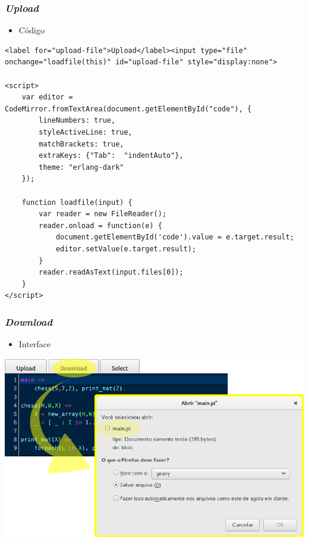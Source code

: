\documentclass[brazil]{beamer}
\begin{document}
\begin{frame}[fragile]

    \frametitle{\textit{Upload}}

    \begin{itemize}
      \item Código
    \end{itemize}

\begin{lstlisting}
<label for="upload-file">Upload</label><input type="file" onchange="loadfile(this)" id="upload-file" style="display:none">

<script>
    var editor = CodeMirror.fromTextArea(document.getElementById("code"), {
        lineNumbers: true,
        styleActiveLine: true,
        matchBrackets: true,
        extraKeys: {"Tab":  "indentAuto"},
        theme: "erlang-dark"
    });

    function loadfile(input) {
        var reader = new FileReader();
        reader.onload = function(e) {
            document.getElementById('code').value = e.target.result;
            editor.setValue(e.target.result);
        }
        reader.readAsText(input.files[0]);
    }
</script>
\end{lstlisting}

\end{frame}


\begin{frame}

    \frametitle{\textit{Download}}

    \begin{itemize}
      \item Interface
    \end{itemize}

\begin{center}
\includegraphics[width=.8\textwidth]{figures/func-download.pdf}
\end{center}

\end{frame}
\end{document}
